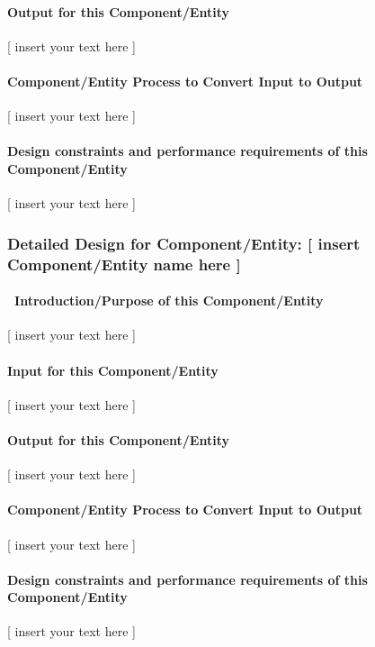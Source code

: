 \documentclass[twoside,letterpaper]{article}
\begin{document}
\paragraph{Output for this Component/Entity}
{\color{black}
[ insert your text here ]}

\paragraph{Component/Entity Process to Convert Input to Output}
{\color{black}
[ insert your text here ]}

\paragraph{Design constraints and performance requirements of this
Component/Entity}
{\color{black}
[ insert your text here ]}

\subsubsection{Detailed Design for Component/Entity: [ insert
Component/Entity name here ]}
\paragraph[\ Introduction/Purpose of this
Component/Entity]{\ Introduction/Purpose of this Component/Entity}
{\color{black}
[ insert your text here ]}

\paragraph{Input for this Component/Entity}
{\color{black}
[ insert your text here ]}

\paragraph{Output for this Component/Entity}
{\color{black}
[ insert your text here ]}

\paragraph{Component/Entity Process to Convert Input to Output}
{\color{black}
[ insert your text here ]}

\paragraph{Design constraints and performance requirements of this
Component/Entity}
{\color{black}
[ insert your text here ]}
\end{document}
